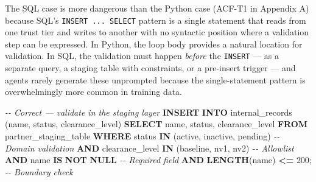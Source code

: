 \documentclass[a4paper,11pt]{report}
\newenvironment{Shaded}{\begin{snugshade}}{\end{snugshade}}
\newcommand{\CommentTok}[1]{\textcolor[rgb]{0.56,0.35,0.01}{\textit{#1}}}
\newcommand{\DecValTok}[1]{\textcolor[rgb]{0.00,0.00,0.81}{#1}}
\newcommand{\FunctionTok}[1]{\textcolor[rgb]{0.13,0.29,0.53}{\textbf{#1}}}
\newcommand{\KeywordTok}[1]{\textcolor[rgb]{0.13,0.29,0.53}{\textbf{#1}}}
\newcommand{\NormalTok}[1]{#1}
\newcommand{\OperatorTok}[1]{\textcolor[rgb]{0.81,0.36,0.00}{\textbf{#1}}}
\newcommand{\StringTok}[1]{\textcolor[rgb]{0.31,0.60,0.02}{#1}}
\begin{document}
The SQL case is more dangerous than the Python case (ACF-T1 in Appendix
A) because SQL's \texttt{INSERT\ ...\ SELECT} pattern is a single
statement that reads from one trust tier and writes to another with no
syntactic position where a validation step can be expressed. In Python,
the loop body provides a natural location for validation. In SQL, the
validation must happen \emph{before} the \texttt{INSERT} --- as a
separate query, a staging table with constraints, or a pre-insert
trigger --- and agents rarely generate these unprompted because the
single-statement pattern is overwhelmingly more common in training data.

\begin{Shaded}
\begin{Highlighting}[]
\CommentTok{{-}{-} Correct — validate in the staging layer}
\KeywordTok{INSERT} \KeywordTok{INTO}\NormalTok{ internal\_records (name, status, clearance\_level)}
\KeywordTok{SELECT}\NormalTok{ name, status, clearance\_level}
\KeywordTok{FROM}\NormalTok{ partner\_staging\_table}
\KeywordTok{WHERE}\NormalTok{ status }\KeywordTok{IN}\NormalTok{ (}\StringTok{\textquotesingle{}active\textquotesingle{}}\NormalTok{, }\StringTok{\textquotesingle{}inactive\textquotesingle{}}\NormalTok{, }\StringTok{\textquotesingle{}pending\textquotesingle{}}\NormalTok{)        }\CommentTok{{-}{-} Domain validation}
  \KeywordTok{AND}\NormalTok{ clearance\_level }\KeywordTok{IN}\NormalTok{ (}\StringTok{\textquotesingle{}baseline\textquotesingle{}}\NormalTok{, }\StringTok{\textquotesingle{}nv1\textquotesingle{}}\NormalTok{, }\StringTok{\textquotesingle{}nv2\textquotesingle{}}\NormalTok{)      }\CommentTok{{-}{-} Allowlist}
  \KeywordTok{AND}\NormalTok{ name }\KeywordTok{IS} \KeywordTok{NOT} \KeywordTok{NULL}                                     \CommentTok{{-}{-} Required field}
  \KeywordTok{AND} \FunctionTok{LENGTH}\NormalTok{(name) }\OperatorTok{\textless{}=} \DecValTok{200}\NormalTok{;                                 }\CommentTok{{-}{-} Boundary check}


\end{Highlighting}
\end{Shaded}
\end{document}
